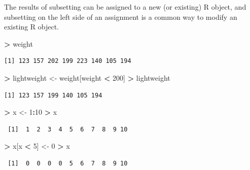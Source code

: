 \documentclass[
]{krantz}
\makeatletter
\newenvironment{Shaded}{\begin{snugshade}}{\end{snugshade}}
\newcommand{\DecValTok}[1]{\textcolor[rgb]{0.06,0.06,0.06}{#1}}
\newcommand{\NormalTok}[1]{#1}
\newcommand{\OperatorTok}[1]{\textcolor[rgb]{0.43,0.43,0.43}{\textbf{#1}}}
\newcommand{\StringTok}[1]{\textcolor[rgb]{0.5,0.5,0.5}{#1}}
\newenvironment{kframe}{%
\medskip{}
\setlength{\fboxsep}{.8em}
 \def\at@end@of@kframe{}%
 \ifinner\ifhmode%
  \def\at@end@of@kframe{\end{minipage}}%
  \begin{minipage}{\columnwidth}%
 \fi\fi%
 \def\FrameCommand##1{\hskip\@totalleftmargin \hskip-\fboxsep
 \colorbox{shadecolor}{##1}\hskip-\fboxsep
     \hskip-\linewidth \hskip-\@totalleftmargin \hskip\columnwidth}%
 \MakeFramed {\advance\hsize-\width
   \@totalleftmargin\z@ \linewidth\hsize
   \@setminipage}}%
 {\par\unskip\endMakeFramed%
 \at@end@of@kframe}
\renewenvironment{Shaded}{\begin{kframe}}{\end{kframe}}
\makeatother
\begin{document}
The results of subsetting can be assigned to a new (or existing) R object, and subsetting on the left side of an assignment is a common way to modify an existing R object.

\begin{Shaded}
\begin{Highlighting}[]
\OperatorTok{\textgreater{}}\StringTok{ }\NormalTok{weight}
\end{Highlighting}
\end{Shaded}

\begin{verbatim}
[1] 123 157 202 199 223 140 105 194
\end{verbatim}

\begin{Shaded}
\begin{Highlighting}[]
\OperatorTok{\textgreater{}}\StringTok{ }\NormalTok{lightweight \textless{}{-}}\StringTok{ }\NormalTok{weight[weight }\OperatorTok{\textless{}}\StringTok{ }\DecValTok{200}\NormalTok{]}
\OperatorTok{\textgreater{}}\StringTok{ }\NormalTok{lightweight}
\end{Highlighting}
\end{Shaded}

\begin{verbatim}
[1] 123 157 199 140 105 194
\end{verbatim}

\begin{Shaded}
\begin{Highlighting}[]
\OperatorTok{\textgreater{}}\StringTok{ }\NormalTok{x \textless{}{-}}\StringTok{ }\DecValTok{1}\OperatorTok{:}\DecValTok{10}
\OperatorTok{\textgreater{}}\StringTok{ }\NormalTok{x}
\end{Highlighting}
\end{Shaded}

\begin{verbatim}
 [1]  1  2  3  4  5  6  7  8  9 10
\end{verbatim}

\begin{Shaded}
\begin{Highlighting}[]
\OperatorTok{\textgreater{}}\StringTok{ }\NormalTok{x[x }\OperatorTok{\textless{}}\StringTok{ }\DecValTok{5}\NormalTok{] \textless{}{-}}\StringTok{ }\DecValTok{0}
\OperatorTok{\textgreater{}}\StringTok{ }\NormalTok{x}
\end{Highlighting}
\end{Shaded}

\begin{verbatim}
 [1]  0  0  0  0  5  6  7  8  9 10
\end{verbatim}
\end{document}
